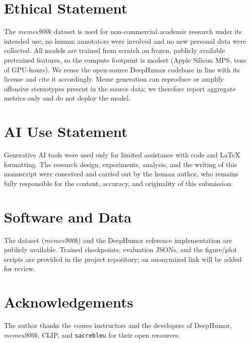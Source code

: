 \documentclass{article}
\theoremstyle{plain}
\theoremstyle{definition}
\theoremstyle{remark}
\begin{document}
\section*{Ethical Statement}
The \textit{memes900k} dataset is used for non-commercial academic research
under its intended use; no human annotators were involved and no new personal
data were collected. All models are trained from scratch on frozen, publicly
available pretrained features, so the compute footprint is modest (Apple
Silicon MPS, tens of GPU-hours). We reuse the open-source DeepHumor codebase in
line with its license and cite it accordingly. Meme generation can reproduce or
amplify offensive stereotypes present in the source data; we therefore report
aggregate metrics only and do not deploy the model.

\section*{AI Use Statement}
Generative AI tools were used only for limited assistance with code and
\LaTeX{} formatting. The research design, experiments, analysis, and the writing
of this manuscript were conceived and carried out by the human author, who
remains fully responsible for the content, accuracy, and originality of this
submission.

\section*{Software and Data}
The dataset (\textit{memes900k}) and the DeepHumor reference implementation are
publicly available. Trained checkpoints, evaluation JSONs, and the figure/plot
scripts are provided in the project repository; an anonymized link will be added
for review.

\section*{Acknowledgements}
The author thanks the course instructors and the developers of DeepHumor,
\textit{memes900k}, CLIP, and \texttt{sacrebleu} for their open resources.



\end{document}

